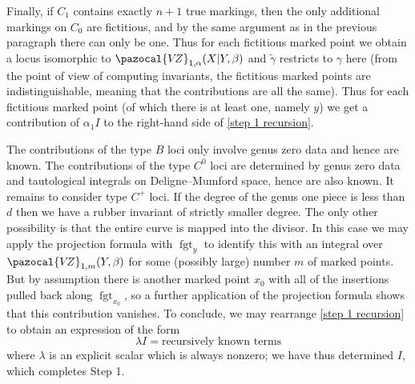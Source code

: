 \documentclass[11pt]{amsart}
\newcommand{\VZ}{\pazocal{V\!Z}}
\newcommand{\fgt}{\operatorname{fgt}}
\theoremstyle{definition}
\theoremstyle{definition}
\begin{document}
Finally, if $C_1$ contains exactly $n+1$ true markings, then the only additional markings on $C_0$ are fictitious, and by the same argument as in the previous paragraph there can only be one. Thus for each fictitious marked point we obtain a locus isomorphic to $\VZ_{1,\alpha}(X|Y,\beta)$ and $\tilde\gamma$ restricts to $\gamma$ here (from the point of view of computing invariants, the fictitious marked points are indistinguishable, meaning that the contributions are all the same). Thus for each fictitious marked point (of which there is at least one, namely $y$) we get a contribution of $\alpha_1 I$ to the right-hand side of \eqref{step 1 recursion}.

The contributions of the type $B$ loci only involve genus zero data and hence are known. The contributions of the type $C^0$ loci are determined by genus zero data and tautological integrals on Deligne--Mumford space, hence are also known. It remains to consider type $C^+$ loci. If the degree of the genus one piece is less than $d$ then we have a rubber invariant of strictly smaller degree. The only other possibility is that the entire curve is mapped into the divisor. In this case we may apply the projection formula with $\fgt_y$ to identify this with an integral over $\VZ_{1,m}(Y,\beta)$ for some (possibly large) number $m$ of marked points. But by assumption there is another marked point $x_0$ with all of the insertions pulled back along $\fgt_{x_0}$, so a further application of the projection formula shows that this contribution vanishes. To conclude, we may rearrange \eqref{step 1 recursion} to obtain an expression of the form
\begin{equation*} \lambda I = \text{recursively known terms} \end{equation*}
where $\lambda$ is an explicit scalar which is always nonzero; we have thus determined $I$, which completes Step 1.
\end{document}
